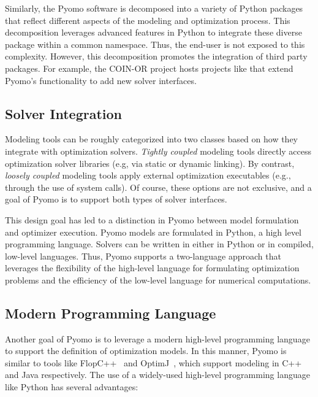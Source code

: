 Similarly, the Pyomo software is decomposed into a variety of Python
packages that reflect different aspects of the modeling and optimization
process.  This decomposition leverages advanced features in Python to
integrate these diverse package within a common  namespace.
Thus, the end-user is not exposed to this complexity.  However,
this decomposition promotes the integration of third party packages.
For example, the COIN-OR  project hosts projects like
 that extend Pyomo's functionality to add new solver
interfaces.


\subsection{Solver Integration}

Modeling tools can be roughly categorized into two classes based on
how they integrate with optimization solvers. {\em Tightly coupled}
modeling tools directly access optimization solver libraries (e.g, via
static or dynamic linking). By contrast, {\em loosely coupled}
modeling tools apply external optimization executables (e.g., through
the use of system calls).  Of course, these options are not exclusive,
and a goal of Pyomo is to support both types of solver interfaces.

This design goal has led to a distinction in Pyomo between model
formulation and optimizer execution.  Pyomo models are formulated in
Python, a high level programming language.  Solvers can be written in
either in Python or in compiled, low-level languages.  Thus, Pyomo
supports a two-language approach that leverages the flexibility of
the high-level language for formulating optimization problems and the
efficiency of the low-level language for numerical computations.


\subsection{Modern Programming Language}

Another goal of Pyomo is to leverage a modern high-level programming
language to support the definition of optimization models.  In this
manner, Pyomo is similar to tools like FlopC++~\citep{flopcpp}
and OptimJ~\citep{OptimJ}, which support modeling in C++ and Java
respectively.  The use of a widely-used high-level programming language
like Python has several advantages:

